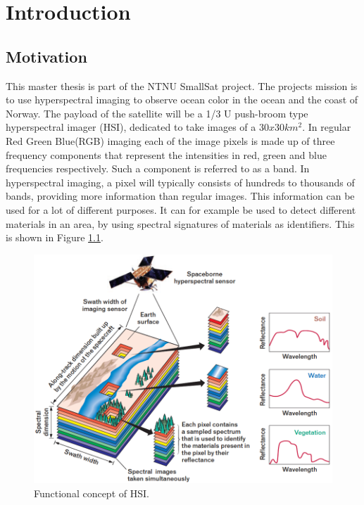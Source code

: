 \newpage
\chapter{Introduction}
\label{sec:introduction}
\section{Motivation}

This master thesis is part of the NTNU SmallSat \cite{SmallSat_project_description} project. The projects mission is to use hyperspectral imaging to observe ocean color in the ocean and the coast of Norway. The payload of the satellite will be a 1/3 U push-broom type hyperspectral imager (HSI), dedicated to take images of a $30x30 km^2$. In regular Red Green Blue(RGB) imaging each of the image pixels is made up of three frequency components that represent the intensities in red, green and blue frequencies respectively. Such a component is referred to as a band. In hyperspectral imaging, a pixel will typically consists of hundreds to thousands of bands, providing more information than regular images. This information can be used for a lot of different purposes. It can for example be used to detect different materials in an area, by using spectral signatures of materials as identifiers. This is shown in Figure \ref{fig:HSI_concept}.\\

\begin{figure}[H]
\centering
   \includegraphics[scale=0.3]{images/Imaging-Spectroscopy-Concept.png}
  \caption{ Functional concept of HSI.\cite{HSI_concept} } 
  \label{fig:HSI_concept}
\end{figure}


